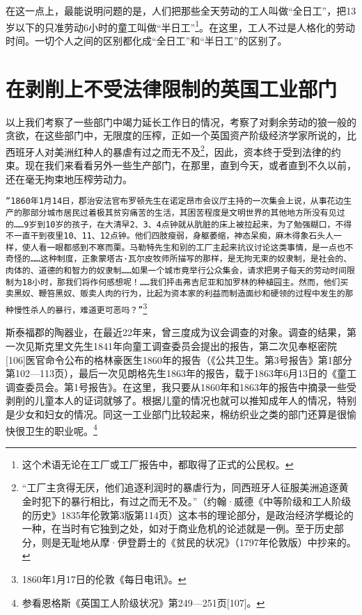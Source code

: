 \documentclass{ctexbook}
\begin{document}
    在这一点上，最能说明问题的是，人们把那些全天劳动的工人叫做“全日工”，把13岁以下的只准劳动6小时的童工叫做“半日工”\footnote{这个术语无论在工厂或工厂报告中，都取得了正式的公民权。}。在这里，工人不过是人格化的劳动时间。一切个人之间的区别都化成“全日工”和“半日工”的区别了。

    \section{在剥削上不受法律限制的英国工业部门}

    以上我们考察了一些部门中竭力延长工作日的情况，考察了对剩余劳动的狼一般的贪欲，在这些部门中，无限度的压榨，正如一个英国资产阶级经济学家所说的，比西班牙人对美洲红种人的暴虐有过之而无不及\footnote{“工厂主贪得无厌，他们追逐利润时的暴虐行为，同西班牙人征服美洲追逐黄金时犯下的暴行相比，有过之而无不及。”（约翰·威德《中等阶级和工人阶级的历史》1835年伦敦第3版第114页）这本书的理论部分，是政治经济学概论的一种，在当时有它独到之处，如对于商业危机的论述就是一例。至于历史部分，则是无耻地从摩·伊登爵士的《贫民的状况》（1797年伦敦版）中抄来的。}，因此，资本终于受到法律的约束。现在我们来看看另外一些生产部门，在那里，直到今天，或者直到不久以前，还在毫无拘束地压榨劳动力。

    \texttt{“1860年1月14日，郡治安法官布罗顿先生在诺定昂市会议厅主持的一次集会上说，从事花边生产的那部分城市居民过着极其贫穷痛苦的生活，其困苦程度是文明世界的其他地方所没有见过的……9岁到10岁的孩子，在大清早2、3、4点钟就从肮脏的床上被拉起来，为了勉强糊口，不得不一直干到夜里10、11、12点钟。他们四肢瘦弱，身躯萎缩，神态呆痴，麻木得象石头人一样，使人看一眼都感到不寒而栗。马勒特先生和别的工厂主起来抗议讨论这类事情，是一点也不奇怪的……这种制度，正象蒙塔古·瓦尔皮牧师所描写的那样，是无拘无束的奴隶制，是社会的、肉体的、道德的和智力的奴隶制……如果一个城市竟举行公众集会，请求把男子每天的劳动时间限制为18小时，那我们将作何感想呢！……我们抨击弗吉尼亚和加罗林的种植园主。然而，他们买卖黑奴、鞭笞黑奴、贩卖人肉的行为，比起为资本家的利益而制造面纱和硬领的过程中发生的那种慢性杀人的暴行，难道更可恶吗？”}\footnote{1860年1月17日的伦敦《每日电讯》。}

    斯泰福郡的陶器业，在最近22年来，曾三度成为议会调查的对象。调查的结果，第一次见斯克里文先生1841年向童工调查委员会提出的报告，第二次见奉枢密院[106]医官命令公布的格林豪医生1860年的报告（《公共卫生。第3号报告》第1部分第102—113页），最后一次见朗格先生1863年的报告，载于1863年6月13日的《童工调查委员会。第1号报告》。在这里，我只要从1860年和1863年的报告中摘录一些受剥削的儿童本人的证词就够了。根据儿童的情况也就可以推知成年人的情况，特别是少女和妇女的情况。同这一工业部门比较起来，棉纺织业之类的部门还算是很愉快很卫生的职业呢。\footnote{参看恩格斯《英国工人阶级状况》第249—251页[107]。}
\end{document}
